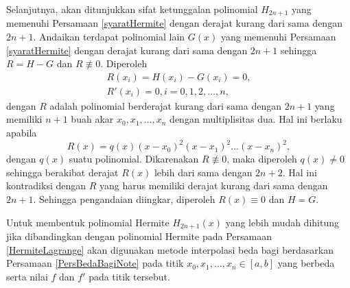Selanjutnya, akan ditunjukkan sifat ketunggalan polinomial $H_{2n+1}$ yang memenuhi Persamaan \eqref{syaratHermite} dengan derajat kurang dari sama dengan $2n+1$. Andaikan terdapat polinomial lain $G(x)$ yang memenuhi Persamaan \eqref{syaratHermite} dengan derajat kurang dari sama dengan $2n+1$ sehingga $R=H-G$ dan $R \not \equiv 0$. Diperoleh
\begin{equation*}
    \begin{gathered}
    R(x_i) = H(x_i) - G(x_i) = 0, \\
    R'(x_i) = 0, i=0,1,2,\dots,n,   
    \end{gathered}
\end{equation*}
dengan $R$ adalah polinomial berderajat kurang dari sama dengan $2n+1$ yang memiliki $n+1$ buah akar $x_0,x_1,\dots,x_n$ dengan multiplisitas dua. Hal ini berlaku apabila
\begin{equation*}
    R(x) = q(x)(x-x_0)^2(x-x_1)^2\dots(x-x_n)^2,
\end{equation*}
dengan $q(x)$ suatu polinomial. Dikarenakan $R\not\equiv 0$, maka diperoleh $q(x) \neq 0$ sehingga berakibat derajat $R(x)$ lebih dari sama dengan $2n+2$. Hal ini kontradiksi dengan $R$ yang harus memiliki derajat kurang dari sama dengan $2n+1$. Sehingga pengandaian diingkar, diperoleh $R(x) \equiv 0$ dan $H = G$.



Untuk membentuk polinomial Hermite \(H_{2n+1}(x)\) yang lebih mudah dihitung jika dibandingkan dengan polinomial Hermite pada Persamaan \eqref{HermiteLagrange} akan digunakan metode interpolasi beda bagi berdasarkan Persamaan \eqref{PersBedaBagiNote} pada titik \(x_0,x_1,\dots,x_n \in [a,b]\) yang berbeda serta nilai \(f\) dan \(f'\) pada titik tersebut.

